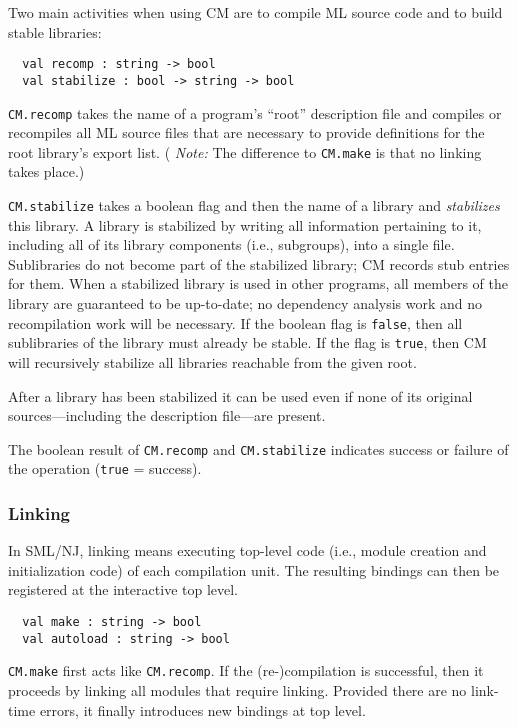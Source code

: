 \documentclass[titlepage,letterpaper]{article}
\begin{document}
Two main activities when using CM are to compile ML source code and to
build stable libraries:

\begin{verbatim}
  val recomp : string -> bool
  val stabilize : bool -> string -> bool
\end{verbatim}

{\tt CM.recomp} takes the name of a program's ``root'' description
file and compiles or recompiles all ML source files that are necessary
to provide definitions for the root library's export list.  ({\em
Note:} The difference to {\tt CM.make} is that no linking takes
place.)

{\tt CM.stabilize} takes a boolean flag and then the name of a library
and {\em stabilizes} this library.  A library is stabilized by writing
all information pertaining to it, including all of its library
components (i.e., subgroups), into a single file.  Sublibraries do not
become part of the stabilized library; CM records stub entries for them.
When a stabilized library is used in other programs, all members of
the library are guaranteed to be up-to-date; no dependency analysis
work and no recompilation work will be necessary.  If the boolean flag
is {\tt false}, then all sublibraries of the library must already be
stable.  If the flag is {\tt true}, then CM will recursively stabilize
all libraries reachable from the given root.

After a library has been stabilized it can be used even if none of its
original sources---including the description file---are present.

The boolean result of {\tt CM.recomp} and {\tt CM.stabilize} indicates
success or failure of the operation ({\tt true} = success).

\subsubsection{Linking}

In SML/NJ, linking means executing top-level code (i.e., module
creation and initialization code) of each compilation unit.  The
resulting bindings can then be registered at the interactive top
level.

\begin{verbatim}
  val make : string -> bool
  val autoload : string -> bool
\end{verbatim}

{\tt CM.make} first acts like {\tt CM.recomp}.  If the
(re-)compilation is successful, then it proceeds by linking all
modules that require linking.  Provided there are no link-time errors,
it finally introduces new bindings at top level.
\end{document}

